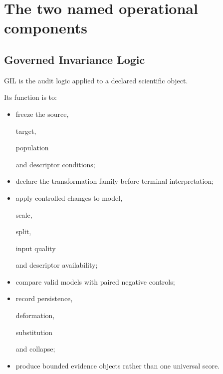 \documentclass[11pt,a4paper,oneside]{report}
\begin{document}
\section{The two named operational components}



\subsection{Governed Invariance Logic}



GIL is the audit logic applied to a declared scientific object.



Its function is to:



\begin{itemize}



\item

freeze the source,

target,

population

and descriptor conditions;



\item

declare the transformation family before terminal interpretation;



\item

apply controlled changes to model,

scale,

split,

input quality

and descriptor availability;



\item

compare valid models with paired negative controls;



\item

record persistence,

deformation,

substitution

and collapse;



\item

produce bounded evidence objects rather than one universal score.



\end{itemize}
\end{document}
